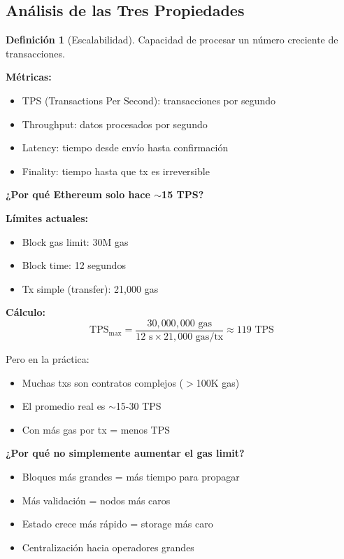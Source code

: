 \documentclass[11pt,a4paper,twoside,openright]{book}
\theoremstyle{definition}
\newtheorem{definition}{Definición}[chapter]
\theoremstyle{plain}
\theoremstyle{remark}
\begin{document}
\subsection{Análisis de las Tres Propiedades}

\begin{definition}[Escalabilidad]
Capacidad de procesar un número creciente de transacciones.

\textbf{Métricas:}
\begin{itemize}
    \item TPS (Transactions Per Second): transacciones por segundo
    \item Throughput: datos procesados por segundo
    \item Latency: tiempo desde envío hasta confirmación
    \item Finality: tiempo hasta que tx es irreversible
\end{itemize}
\end{definition}

\begin{mathnote}
\textbf{¿Por qué Ethereum solo hace $\sim$15 TPS?}

\textbf{Límites actuales:}
\begin{itemize}
    \item Block gas limit: 30M gas
    \item Block time: 12 segundos
    \item Tx simple (transfer): 21,000 gas
\end{itemize}

\textbf{Cálculo:}
\[ \text{TPS}_{\text{max}} = \frac{30,000,000 \text{ gas}}{12 \text{ s} \times 21,000 \text{ gas/tx}} \approx 119 \text{ TPS} \]

Pero en la práctica:
\begin{itemize}
    \item Muchas txs son contratos complejos ($>$100K gas)
    \item El promedio real es $\sim$15-30 TPS
    \item Con más gas por tx = menos TPS
\end{itemize}

\textbf{¿Por qué no simplemente aumentar el gas limit?}
\begin{itemize}
    \item Bloques más grandes = más tiempo para propagar
    \item Más validación = nodos más caros
    \item Estado crece más rápido = storage más caro
    \item Centralización hacia operadores grandes
\end{itemize}
\end{mathnote}
\end{document}
